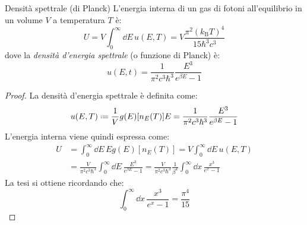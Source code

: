 \begin{theorem}{Densità spettrale (di Planck)}{}
	L'energia interna di un gas di fotoni all'equilibrio in un volume $ V $ a temperatura $ T $ è:
	\begin{equation}
		U = V \int_0^\infty \dd E\, u(E,T) = V \frac{\pi^2 (k_\text{B} T)^4}{15 \hbar^3 c^3}
	\end{equation}
	dove la \textit{densità d'energia spettrale} (o funzione di Planck) è:
	\begin{equation}
		u(E,t) = \frac{1}{\pi^2 c^3 \hbar^3} \frac{E^3}{e^{\beta E} - 1}
	\end{equation}

	\tcblower

	\begin{proof}
		La densità d'energia spettrale è definita come:
		\begin{equation*}
			u(E,T) \defeq \frac{1}{V} g(E) [n_E(T)] E = \frac{1}{\pi^2 c^3 \hbar^3} \frac{E^3}{e^{\beta E} - 1}
		\end{equation*}
		L'energia interna viene quindi espressa come:
		\begin{equation*}
			\begin{split}
				U
				& = \int_0^\infty \dd E\, E g(E) [n_E(T)] = V \int_0^\infty \dd E\, u(E,T) \\
				& = \frac{V}{\pi^2 c^3 \hbar^3} \int_0^\infty \dd E\, \frac{E^3}{e^{\beta E} - 1} = \frac{V}{\pi^2 c^3 \hbar^3} \frac{1}{\beta^4} \int_0^\infty \dd x\, \frac{x^3}{e^x - 1}
			\end{split}
		\end{equation*}
		La tesi si ottiene ricordando che:
		\begin{equation}
			\int_0^\infty \dd x\, \frac{x^3}{e^x - 1} = \frac{\pi^4}{15}
			\label{eq:zeta-3}
		\end{equation}
	\end{proof}
\end{theorem}

